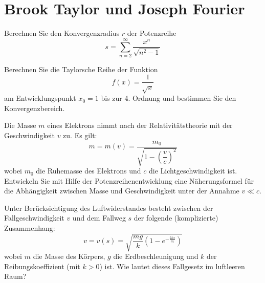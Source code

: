 \section{Brook Taylor und Joseph Fourier}

\begin{ejercicio}
    Berechnen Sie den Konvergenzradius $r$ der Potenzreihe
    \begin{equation*}
        s = \sum_{n=2}^{\infty} \dfrac{x^n}{\sqrt{n^2 - 1}}
    \end{equation*}
\end{ejercicio}

\begin{ejercicio}
    Berechnen Sie die Taylorsche Reihe der Funktion
    \begin{equation*}
        f(x) = \dfrac{1}{\sqrt{x}}
    \end{equation*}
    am Entwicklungspunkt $x_0 = 1$ bis zur 4. Ordnung und bestimmen Sie den Konvergenzbereich.
\end{ejercicio}

\begin{ejercicio}
    Die Masse $m$ eines Elektrons nimmt nach der Relativitätstheorie mit der Geschwindigkeit $v$ zu. Es gilt:
    \begin{equation*}
        m = m(v) = \dfrac{m_0}{\sqrt{1 - \left(\dfrac{v}{c}\right)^2}}
    \end{equation*}
    wobei $m_0$ die Ruhemasse des Elektrons und $c$ die Lichtgeschwindigkeit ist. Entwickeln Sie mit Hilfe der Potenzreihenentwicklung eine Näherungsformel für die Abhängigkeit zwischen Masse und Geschwindigkeit unter der Annahme $v \ll c$.
\end{ejercicio}

\begin{ejercicio}
    Unter Berücksichtigung des Luftwiderstandes besteht zwischen der Fallgeschwindigkeit $v$ und dem Fallweg $s$ der folgende (komplizierte) Zusammenhang:
    \begin{equation*}
        v = v(s) = \sqrt{\dfrac{mg}{k} \left(1 - e^{-\frac{2ks}{m}}\right)}
    \end{equation*}
    wobei $m$ die Masse des Körpers, $g$ die Erdbeschleunigung und $k$ der Reibungskoeffizient (mit $k > 0$) ist. Wie lautet dieses Fallgesetz im luftleeren Raum?
\end{ejercicio}

